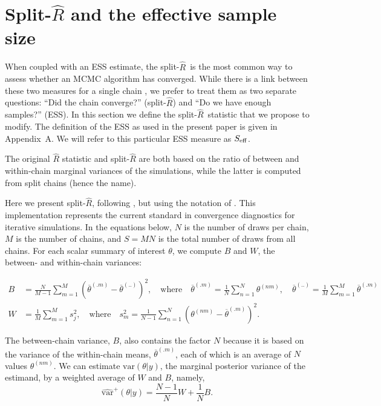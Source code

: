 \documentclass[american,]{article}
\newcommand{\sRhat}{split-$\widehat{R}$}
\theoremstyle{definition}
\begin{document}
\hypertarget{SplitRhat}{%
\section{Split-$\widehat{R}$ and the effective sample size}\label{SplitRhat}}

When coupled with an ESS estimate, the  \sRhat\ is the most common way to
assess whether an MCMC algorithm has converged.  While there is a link between
these two measures  for a single chain \citep{vats2018revisiting}, we prefer to 
treat them as two separate questions: ``Did the chain converge?'' (\sRhat) and 
``Do we have enough samples?'' (ESS).  In this section we define the \sRhat\ 
statistic that we propose to modify. 
The definition of the ESS as used in the present paper is given in Appendix~A.
We will refer to this particular ESS measure as \(S_{\rm eff}\).

The original \(\widehat{R}\) statistic
\citep{Gelman+Rubin:1992, Brooks+Gelman:1998} and
split-\(\widehat{R}\) \citep{BDA3} are both based on the ratio of
between and within-chain marginal variances of the simulations, while
the latter is computed from split chains (hence the name).

Here we present split-\(\widehat{R}\),
following \citet{BDA3}, but using the notation of
\citet{StanBook}. This implementation represents the current 
standard in convergence diagnostics for iterative simulations. In the
equations below, \(N\) is the number of draws per chain, \(M\) is the
number of chains, and \(S=MN\) is the total number of draws from all
chains. For each scalar summary of interest \(\theta\), we compute \(B\)
and \(W\), the between- and within-chain variances:

\begin{align}
B &= \frac{N}{M-1}\sum_{m=1}^{M}(\overline{\theta}^{(.m)} - 
\overline{\theta}^{(..)})^2, \quad \mbox{where} \quad 
\overline{\theta}^{(.m)}=\frac{1}{N}\sum_{n=1}^N \theta^{(nm)}, \quad
\overline{\theta}^{(..)} = \frac{1}{M}\sum_{m=1}^M\overline{\theta}^{(.m)} 
\\
W &= \frac{1}{M}\sum_{m=1}^{M}s_j^2, \quad \mbox{where} \quad
s_m^2=\frac{1}{N-1} \sum_{n=1}^N (\theta^{(nm)}-\overline{\theta}^{(.m)})^2.
\end{align}

The between-chain variance, \(B\), also contains the factor \(N\)
because it is based on the variance of the within-chain means,
\(\overline{\theta}^{(.m)}\), each of which is an average of \(N\)
values \(\theta^{(nm)}\). We can estimate \(\mbox{var}(\theta | y)\),
the marginal posterior variance of the estimand, by a weighted average
of \(W\) and \(B\), namely,
\begin{equation}
\widehat{\mbox{var}}^+(\theta| y) = \frac{N-1}{N}W + \frac{1}{N}B.
\end{equation}
\end{document}
